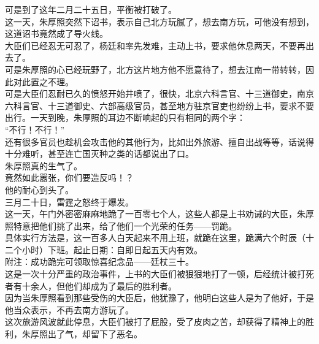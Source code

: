 \begin{multicols}{\theparacolNo}
可是到了这年二月二十五日，平衡被打破了。\\

这一天，朱厚照突然下诏书，表示自己北方玩腻了，想去南方玩，可他没有想到，这道诏书竟然成了导火线。\\

大臣们已经忍无可忍了，杨廷和率先发难，主动上书，要求他休息两天，不要再出去了。\\

可是朱厚照的心已经玩野了，北方这片地方他不愿意待了，想去江南一带转转，因此对此置之不理。\\

可是大臣们忍耐已久的愤怒开始井喷了，很快，北京六科言官、十三道御史，南京六科言官、十三道御史、六部高级官员，甚至地方驻京官吏也纷纷上书，要求不要出行。一天到晚，朱厚照的耳边不断响起的只有相同的两个字：\\

“不行！不行！”\\

还有很多官员也趁机会攻击他的其他行为，比如出外旅游、擅自出战等等，话说得十分难听，甚至连亡国灭种之类的话都说出了口。\\

朱厚照真的生气了。\\

竟然如此嚣张，你们要造反吗！？\\

他的耐心到头了。\\

三月二十日，雷霆之怒终于爆发。\\

这一天，午门外密密麻麻地跪了一百零七个人，这些人都是上书劝诫的大臣，朱厚照特意把他们挑了出来，给了他们一个光荣的任务——罚跪。\\

具体实行方法是，这一百多人白天起来不用上班，就跪在这里，跪满六个时辰（十二个小时）下班。起止日期：自即日起五天内有效。\\

附注：成功跪完可领取惊喜纪念品——廷杖三十。\\

这是一次十分严重的政治事件，上书的大臣们被狠狠地打了一顿，后经统计被打死者有十余人，但他们却成为了最后的胜利者。\\

因为当朱厚照看到那些受伤的大臣后，他犹豫了，他明白这些人是为了他好，于是他当众表示，不再去南方游玩了。\\

这次旅游风波就此停息，大臣们被打了屁股，受了皮肉之苦，却获得了精神上的胜利，朱厚照出了气，却留下了恶名。\\


\end{multicols}
